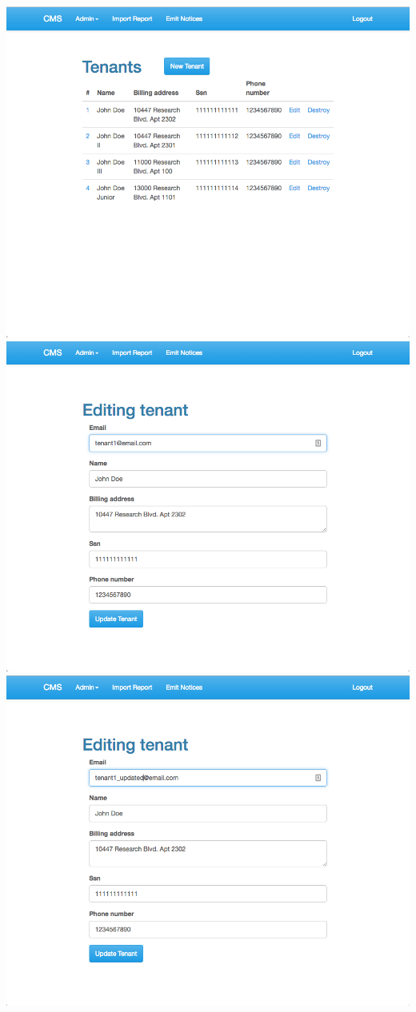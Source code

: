\begin{itemize}
    \includegraphics[scale=0.25]{./images/ss/tenant/edit/2.png}\\
    \includegraphics[scale=0.25]{./images/ss/tenant/edit/3.png}
    \includegraphics[scale=0.25]{./images/ss/tenant/edit/4.png}\\

\end{itemize}
